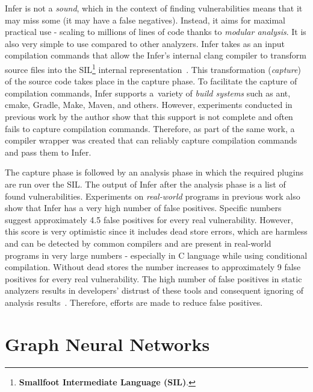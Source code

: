 Infer is not a \textit{sound}, which in the context of finding vulnerabilities means that it may miss some (it may have a false negatives). Instead, it aims for maximal practical use - scaling to millions of lines of code thanks to \textit{modular analysis}. It is also very simple to use \cite{infer-usage} compared to other analyzers. Infer takes as an input compilation commands that allow the Infer's internal clang compiler to transform source files into the SIL\footnote{\textbf{Smallfoot Intermediate Language (SIL)}.} internal representation~\cite{SIL2, SIL}. This transformation (\textit{capture}) of the source code takes place in the capture phase. To facilitate the capture of compilation commands, Infer supports a~variety of \textit{build systems} such as ant, cmake, Gradle, Make, Maven, and others. However, experiments conducted in previous work by the author \cite{bc} show that this support is not complete and often fails to capture compilation commands. Therefore, as part of the same work, a compiler wrapper was created that can reliably capture compilation commands and pass them to Infer.

The capture phase is followed by an analysis phase in which the required plugins are run over the SIL. The output of Infer after the analysis phase is a list of found vulnerabilities. Experiments on \textit{real-world} programs in previous work \cite{bc} also show that Infer has a very high number of false positives. Specific numbers suggest approximately 4.5 false positives for every real vulnerability. However, this score is very optimistic since it includes dead store errors, which are harmless and can be detected by common compilers and are present in real-world programs in very large numbers - especially in C language while using conditional compilation. Without dead stores the number increases to approximately 9 false positives for every real vulnerability. The high number of false positives in static analyzers results in developers' distrust of these tools and consequent ignoring of analysis results~\cite{InferInFB, DisadvantagesOfStaticAnalysis, DisadvantagesOfStaticAnalysis2}. Therefore, efforts are made to reduce false positives.

\section{Graph Neural Networks}
\label{gnn}

